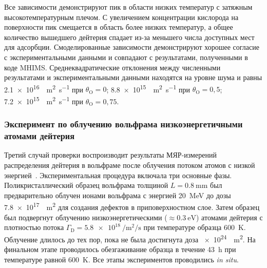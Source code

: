 Все зависимости демонстрируют пик в области низких температур с затяжным высокотемпературным плечом. С увеличением концентрации кислорода на поверхности пик смещается в область более низких температур, а общее количество вышедшего дейтерия спадает из-за меньшего числа доступных мест для адсорбции. Смоделированные зависимости демонстрируют хорошее согласие с экспериментальными данными и совпадают с результатами, полученными в коде MHIMS. Среднеквадратические отклонения между численными результатами и экспериментальными данными находятся на уровне шума и равны \SI{2.1e16}{\per\meter\squared\per\second} при \( \theta_\mathrm{O}=0 \); \SI{8.8e15}{\per\meter\squared\per\second} при \( \theta_\mathrm{O}=0,5 \); \SI{7.2e15}{\per\meter\squared\per\second} при \( \theta_\mathrm{O}=0,75 \). 

\subsubsection{Эксперимент по облучению вольфрама низкоэнергетичными атомами дейтерия}
Третий случай проверки воспроизводит результаты МЯР-измерений распределения дейтерия в вольфраме после облучения потоком атомов с низкой энергией~\cite{Markelj2016}. Экспериментальная процедура включала три основные фазы. Поликристаллический образец вольфрама толщиной \(L=\SI{0.8}{\milli\meter}\) был предварительно облучен ионами вольфрама с энергией \SI{20}{\mega\electronvolt} до дозы \SI{7.8e17}{\per\meter\squared} для создания дефектов в приповерхностном слое. Затем образец был подвергнут облучению низкоэнергетическими (\(\approx\SI{0.3}{\electronvolt}\)) атомами дейтерия с плотностью потока \(\Gamma_\mathrm{D}=\SI{5.8e18}{\per\meter\squared\per\second}\) при температуре образца \SI{600}{\kelvin}. Облучение длилось до тех пор, пока не была достигнута доза \SI{e24}{\per\meter\squared}. На финальном этапе проводилось обезгаживание образца в течение \SI{43}{\hour} при температуре равной \SI{600}{K}. Все этапы экспериментов проводились \textit{in situ}.

